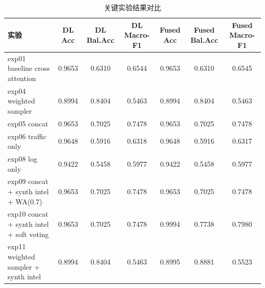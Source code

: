 \begin{table}[H]
\centering
\caption{关键实验结果对比}
\label{tab:keyresults}
\begin{tabular}{p{3.5cm}cccccc}
\toprule
实验 & DL Acc & DL Bal.Acc & DL Macro-F1 & Fused Acc & Fused Bal.Acc & Fused Macro-F1 \\
\midrule
exp01 baseline cross attention & 0.9653 & 0.6310 & 0.6544 & 0.9653 & 0.6310 & 0.6545 \\
exp04 weighted sampler & 0.8994 & 0.8404 & 0.5463 & 0.8994 & 0.8404 & 0.5463 \\
exp05 concat & 0.9653 & 0.7025 & 0.7478 & 0.9653 & 0.7025 & 0.7478 \\
exp06 traffic only & 0.9648 & 0.5916 & 0.6318 & 0.9648 & 0.5916 & 0.6317 \\
exp08 log only & 0.9422 & 0.5458 & 0.5977 & 0.9422 & 0.5458 & 0.5977 \\
exp09 concat + synth intel + WA(0.7) & 0.9653 & 0.7025 & 0.7478 & 0.9653 & 0.7025 & 0.7478 \\
exp10 concat + synth intel + soft voting & 0.9653 & 0.7025 & 0.7478 & 0.9994 & 0.7738 & 0.7980 \\
exp11 weighted sampler + synth intel & 0.8994 & 0.8404 & 0.5463 & 0.8995 & 0.8881 & 0.5523 \\
\bottomrule
\end{tabular}
\end{table}
